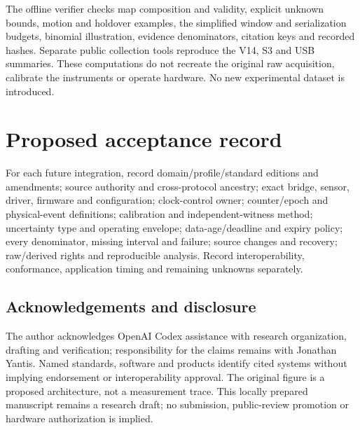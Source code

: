 \documentclass[11pt,letterpaper]{article}
\begin{document}
The offline verifier checks map composition and validity, explicit unknown bounds, motion and holdover examples, the simplified window and serialization budgets, binomial illustration, evidence denominators, citation keys and recorded hashes. Separate public collection tools reproduce the V14, S3 and USB summaries. These computations do not recreate the original raw acquisition, calibrate the instruments or operate hardware. No new experimental dataset is introduced.

\section{Proposed acceptance record}
For each future integration, record domain/profile/standard editions and amendments; source authority and cross-protocol ancestry; exact bridge, sensor, driver, firmware and configuration; clock-control owner; counter/epoch and physical-event definitions; calibration and independent-witness method; uncertainty type and operating envelope; data-age/deadline and expiry policy; every denominator, missing interval and failure; source changes and recovery; raw/derived rights and reproducible analysis. Record interoperability, conformance, application timing and remaining unknowns separately.

\clearpage
\begin{samepage}
\section*{Acknowledgements and disclosure}
The author acknowledges OpenAI Codex assistance with research organization, drafting and verification; responsibility for the claims remains with Jonathan Yantis. Named standards, software and products identify cited systems without implying endorsement or interoperability approval. The original figure is a proposed architecture, not a measurement trace. This locally prepared manuscript remains a research draft; no submission, public-review promotion or hardware authorization is implied.
\end{samepage}
\end{document}
